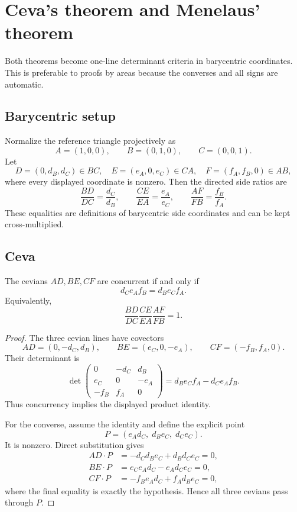 \section{Ceva's theorem and Menelaus' theorem}

Both theorems become one-line determinant criteria in barycentric coordinates.  This is preferable to proofs by areas because the converses and all signs are automatic.

\subsection{Barycentric setup}

Normalize the reference triangle projectively as
\[
A=(1,0,0),\qquad B=(0,1,0),\qquad C=(0,0,1).
\]
Let
\[
D=(0,d_B,d_C)\in BC,\quad
E=(e_A,0,e_C)\in CA,\quad
F=(f_A,f_B,0)\in AB,
\]
where every displayed coordinate is nonzero.  Then the directed side ratios are
\[
\frac{BD}{DC}=\frac{d_C}{d_B},\qquad
\frac{CE}{EA}=\frac{e_A}{e_C},\qquad
\frac{AF}{FB}=\frac{f_B}{f_A}.
\]
These equalities are definitions of barycentric side coordinates and can be kept cross-multiplied.

\subsection{Ceva}

\begin{theorem}
The cevians $AD,BE,CF$ are concurrent if and only if
\[
d_Ce_Af_B=d_Be_Cf_A.
\]
Equivalently,
\[
\frac{BD}{DC}\frac{CE}{EA}\frac{AF}{FB}=1.
\]
\end{theorem}

\begin{proof}
The three cevian lines have covectors
\[
AD=(0,-d_C,d_B),\qquad
BE=(e_C,0,-e_A),\qquad
CF=(-f_B,f_A,0).
\]
Their determinant is
\[
\det\begin{pmatrix}
0&-d_C&d_B\\
e_C&0&-e_A\\
-f_B&f_A&0
\end{pmatrix}
=d_Be_Cf_A-d_Ce_Af_B.
\]
Thus concurrency implies the displayed product identity.

For the converse, assume the identity and define the explicit point
\[
P=(e_Ad_C,\;d_Be_C,\;d_Ce_C).
\]
It is nonzero.  Direct substitution gives
\begin{align*}
AD\cdot P&=-d_Cd_Be_C+d_Bd_Ce_C=0,\\
BE\cdot P&=e_Ce_Ad_C-e_Ad_Ce_C=0,\\
CF\cdot P&=-f_Be_Ad_C+f_Ad_Be_C=0,
\end{align*}
where the final equality is exactly the hypothesis.  Hence all three cevians pass through $P$.
\end{proof}

